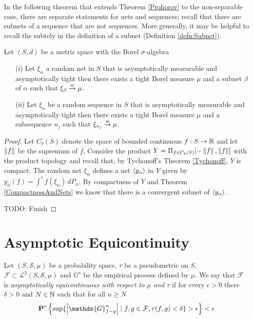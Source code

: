In the following theorem that extends Theorem \ref{Prohorov} to the non-separable case, there are separate statements for nets and sequences; recall that there are subnets of a sequence that are not sequences.  More generally, it may be helpful to recall the subtely in the definition of a subnet (Definition \ref{defn:Subnet}).
\begin{thm}\label{ProhorovHoffmanJorgensen}Let $(S,d)$ be a metric space  with the Borel $\sigma$-algebra  
\begin{itemize}
\item[(i)] Let $\xi_\alpha$ a random net in $S$ that is asymptotically measurable and asymptotically tight then there exists a tight Borel measure $\mu$ and a subnet $\beta$ of $\alpha$ such that $\xi_\beta \overset{w}\to \mu$.
\item[(ii)] Let $\xi_n$ be a random sequence in $S$ that is asymptotically measurable and asymptotically tight then there exists a tight Borel measure $\mu$ and a subsequence $n_j$ such that $\xi_{n_j} \overset{w}\to \mu$.
\end{itemize}
\end{thm}
\begin{proof}
Let $C_b(S)$ denote the space of bounded continuous $f : S \to \mathbb{R}$ and let $\left \lVert f \right \rVert$ be the supremum of $f$.  Consider the product $Y = \Pi_{f \in C_b(S)} [-\left \lVert f \right \rVert, \left \lVert f \right \rVert]$ with the product topology and recall that, by Tychonoff's Theorem \ref{Tychonoff}, $Y$ is compact.  The random net $\xi_\alpha$ defines a net $\langle y_{\alpha} \rangle$ in $Y$ given by $y_\alpha(f) = \int^* f(\xi_\alpha) \, dP_\alpha$.  By compactness of $Y$ and Theorem \ref{CompactnessAndNets} we know that there is a convergent subnet of $\langle y_{\alpha} \rangle$.  

TODO: Finish
\end{proof}

\section{Asymptotic Equicontinuity}

\begin{defn}Let $(S,\mathcal{S}, \mu)$ be a probability space, $\tau$ be a pseudometric on $S$, $\mathcal{F} \subset \mathcal{L}^2(S, \mathcal{S}, \mu)$ and $\mathds{G}^n$ be the empirical process defined by $\mu$.  We say that $\mathcal{F}$ is \emph{asymptotically equicontinuous with respect to $\mu$ and $\tau$} if for every $\epsilon > 0$ there $\delta > 0$ and $N \in \mathbb{N}$ such that for all $n \geq N$ 
\begin{align*}
\oprobability{\sup \lbrace \abs{\mathds{G}^n_{f-g}} \mid f,g \in \mathcal{F}, \tau(f,g) < \delta \rbrace > \epsilon} < \epsilon
\end{align*}
\end{defn}

